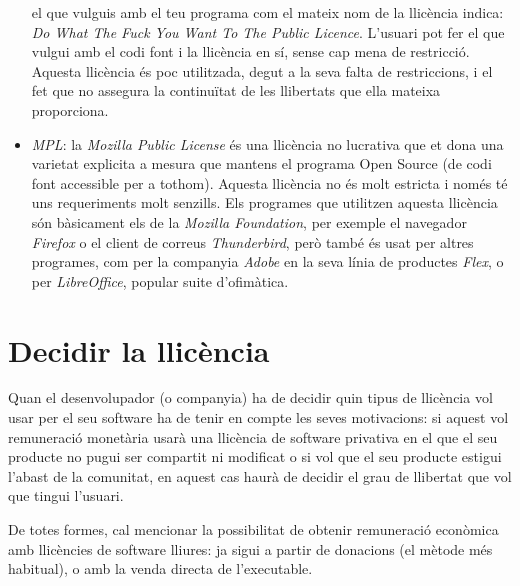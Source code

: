 \begin{itemize}
	el que vulguis amb el teu programa com el mateix nom de la llicència indica:
	\emph{Do What The Fuck You Want To The Public Licence}.
	L'usuari pot fer el que vulgui amb el codi font i la llicència en sí, sense
	cap mena de restricció. Aquesta llicència és poc utilitzada, degut a la seva
	falta de restriccions, i el fet que no assegura la continuïtat de les llibertats
	que ella mateixa proporciona.\cite {tldr}
	\item \emph{MPL}: la \emph{Mozilla Public License} és una llicència no lucrativa 
	que et dona una varietat explicita a mesura que mantens el programa Open Source
	(de codi font accessible per a tothom). Aquesta llicència no és molt estricta
	i només té uns requeriments molt senzills.
	Els programes que utilitzen aquesta llicència són bàsicament els de la \emph{Mozilla Foundation},
	per exemple el navegador \emph{Firefox} o el client de correus \emph{Thunderbird},
	però també és usat per altres programes, com per la companyia \emph{Adobe} en
	la seva línia de productes \emph{Flex}, o per \emph{LibreOffice}, popular suite
	d'ofimàtica. \cite {tldr}
\end{itemize}

\section{Decidir la llicència}
Quan el desenvolupador (o companyia) ha de decidir quin tipus de llicència vol
usar per el seu software ha de tenir en compte les seves motivacions: si aquest
vol remuneració monetària usarà una llicència de software privativa en el que el 
seu producte no pugui ser compartit ni modificat o si vol que el seu producte estigui l'abast de 
la comunitat, en aquest cas haurà de decidir el grau de llibertat que vol que tingui 
l'usuari.

De totes formes, cal mencionar la possibilitat de obtenir remuneració econòmica amb llicències
de software lliures: ja sigui a partir de donacions (el mètode més habitual), o amb la
venda directa de l'executable.

